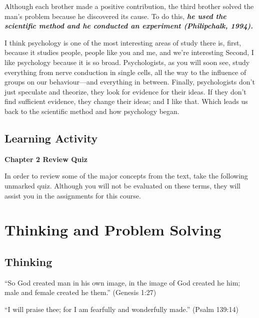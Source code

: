 \documentclass[
]{book}
\begin{document}
Although each brother made a positive contribution, the third brother solved the man's problem because he discovered its cause. To do this, \textbf{\emph{he used the scientific method and he conducted an experiment (Philipchalk, 1994).}}

I think psychology is one of the most interesting areas of study there is, first, because it studies people, people like you and me, and we're interesting Second, I like psychology because it is so broad. Psychologists, as you will soon see, study everything from nerve conduction in single cells, all the way to the influence of groups on our behaviour---and everything in between. Finally, psychologists don't just speculate and theorize, they look for evidence for their ideas. If they don't find sufficient evidence, they change their ideas; and I like that. Which leads us back to the scientific method and how psychology began.

\hypertarget{learning-activity}{%
\subsection*{Learning Activity}\label{learning-activity}}

\begin{reflect}
\textbf{Chapter 2 Review Quiz}

In order to review some of the major concepts from the text, take the following unmarked quiz. Although you will not be evaluated on these terms, they will assist you in the assignments for this course.
\end{reflect}

\hypertarget{thinking-and-problem-solving}{%
\section{Thinking and Problem Solving}\label{thinking-and-problem-solving}}

\hypertarget{thinking}{%
\subsection*{Thinking}\label{thinking}}

``So God created man in his own image, in the image of God created he him; male and female created he them.'' (Genesis 1:27)

``I will praise thee; for I am fearfully and wonderfully made.'' (Psalm 139:14)
\end{document}
